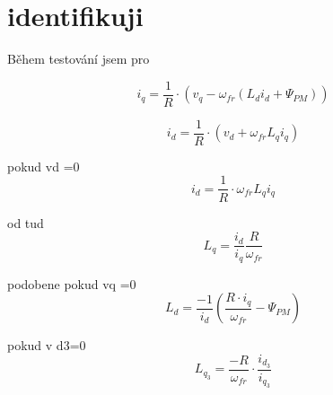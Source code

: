 \section{identifikuji}
Během testování jsem 
pro 



\begin{equation}
i_q
=
\frac{1}{R}\cdot(
v_q-\omega_{fr}(L_d i_d+\Psi_{PM}))
\end{equation}






\begin{equation}
i_d
=
\frac{1}{R} \cdot (v_d+\omega_{fr} L_q i_q)
\end{equation}

 pokud vd =0
 \begin{equation}
i_d
=
\frac{1}{R} \cdot \omega_{fr} L_q i_q
\end{equation}

od tud
\begin{equation}
    L_q=\frac{i_d}{i_q}
    \frac{R} {\omega_{fr}}
\end{equation}


podobene pokud vq =0 
\begin{equation}
    L_d=\frac{-1}{i_d}\left( \frac{R \cdot i_q}{\omega_{fr}}-\Psi_{PM} \right)
\end{equation}

pokud v d3=0
\begin{equation}
    L_{q_3}=\frac{-R}{\omega_{fr}}\cdot \frac{i_{d_3}}{i_{q_3}}
\end{equation}